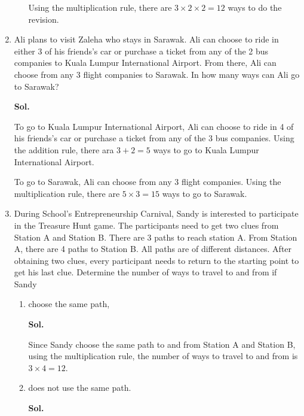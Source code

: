 \documentclass{report}
\newcommand{\sol}[1]{

      \noindent \textbf{Sol.}
}
\def\eos{\quad\hbox{\rlap{\hbox{\vrule depth 1.5pt height 2.6mm width 0.2mm \hskip 1mm \vrule height 2.6mm width 0.2mm}}{\vbox{\hrule height 0.2mm width 1.4mm \vskip 2.8mm \hrule depth 1.5pt height -0.35mm width 1.2mm}}}}
\begin{document}
\begin{multicols*}{2}
\begin{enumerate}
\begin{enumerate}
                              Using the multiplication rule, there are $3 \times 2 \times 2 = 12$ ways to do
                              the revision. $\eos$
                  \end{enumerate}

            \item Ali plans to visit Zaleha who stays in Sarawak. Ali can choose to ride in
                  either 3 of his friends's car or purchase a ticket from any of the 2 bus
                  companies to Kuala Lumpur International Airport. From there, Ali can choose
                  from any 3 flight companies to Sarawak. In how many ways can Ali go to Sarawak?
                  \sol{}

                  To go to Kuala Lumpur International Airport, Ali can choose to ride in 4 of his
                  friends's car or purchase a ticket from any of the 3 bus companies. Using the
                  addition rule, there ara $3 + 2 = 5$ ways to go to Kuala Lumpur International
                  Airport.

                  To go to Sarawak, Ali can choose from any 3 flight companies. Using the
                  multiplication rule, there are $5 \times 3 = 15$ ways to go to Sarawak. $\eos$

            \item During School's Entrepreneurship Carnival, Sandy is interested to participate
                  in the Treasure Hunt game. The participants need to get two clues from Station
                  A and Station B. There are 3 paths to reach station A. From Station A, there
                  are 4 paths to Station B. All paths are of different distances. After obtaining
                  two clues, every participant needs to return to the starting point to get his
                  last clue. Determine the number of ways to travel to and from if Sandy
                  \begin{enumerate}
                        \item choose the same path, \sol{}

                              Since Sandy choose the same path to and from Station A and Station B, using the
                              multiplication rule, the number of ways to travel to and from is $3 \times 4 =
                                    12$. $\eos$

                        \item does not use the same path. \sol{}


\end{enumerate}
\end{enumerate}
\end{multicols*}
\end{document}
